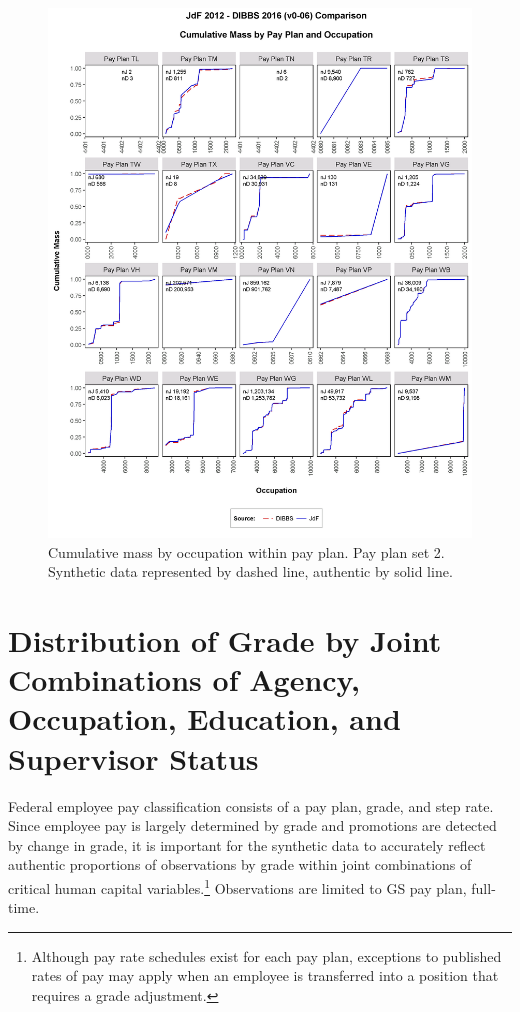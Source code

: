 \documentclass[10pt, letterpaper]{article}
\begin{document}
\begin{spacing}{1.0}
\clearpage

\begin{figure}[]
    \centering
    \includegraphics[width=6.25in, trim={0 1in 0 0.75in}, clip]{CMFOccupationPayPlan141.png}
    \caption{Cumulative mass by occupation within pay plan.  Pay plan set 2. Synthetic data represented by dashed line, authentic by solid line.}
    \label{figure:CMFOccupationPayPlan2}
\end{figure}

\clearpage

\section{Distribution of Grade by Joint Combinations of Agency, Occupation, Education, and Supervisor Status}

Federal employee pay classification consists of a pay plan, grade, and step rate.  Since employee pay is largely determined by grade and promotions are detected by change in grade, it is important for the synthetic data to accurately reflect authentic proportions of observations by grade within joint combinations of critical human capital variables.\footnote{Although pay rate schedules exist for each pay plan, exceptions to published rates of pay may apply when an employee is transferred into a position that requires a grade adjustment.}  Observations are limited to GS pay plan, full-time.


\end{spacing}
\end{document}
